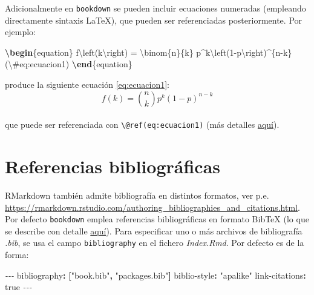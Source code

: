 \documentclass[
]{book}
\newenvironment{Shaded}{\begin{snugshade}}{\end{snugshade}}
\newcommand{\AttributeTok}[1]{\textcolor[rgb]{0.77,0.63,0.00}{#1}}
\newcommand{\CharTok}[1]{\textcolor[rgb]{0.31,0.60,0.02}{#1}}
\newcommand{\ExtensionTok}[1]{#1}
\newcommand{\FunctionTok}[1]{\textcolor[rgb]{0.00,0.00,0.00}{#1}}
\newcommand{\KeywordTok}[1]{\textcolor[rgb]{0.13,0.29,0.53}{\textbf{#1}}}
\newcommand{\NormalTok}[1]{#1}
\newcommand{\PreprocessorTok}[1]{\textcolor[rgb]{0.56,0.35,0.01}{\textit{#1}}}
\newcommand{\SpecialCharTok}[1]{\textcolor[rgb]{0.00,0.00,0.00}{#1}}
\newcommand{\SpecialStringTok}[1]{\textcolor[rgb]{0.31,0.60,0.02}{#1}}
\newcommand{\StringTok}[1]{\textcolor[rgb]{0.31,0.60,0.02}{#1}}
\theoremstyle{definition}
\theoremstyle{definition}
\theoremstyle{definition}
\theoremstyle{definition}
\theoremstyle{remark}
\begin{document}
Adicionalmente en \texttt{bookdown} se pueden incluir ecuaciones numeradas (empleando directamente sintaxis LaTeX), que pueden ser referenciadas posteriormente. Por ejemplo:

\begin{Shaded}
\begin{Highlighting}[]
\KeywordTok{\textbackslash{}begin}\NormalTok{\{}\ExtensionTok{equation}\NormalTok{\}}\SpecialStringTok{ }
\SpecialStringTok{  f}\SpecialCharTok{\textbackslash{}left}\SpecialStringTok{(k}\SpecialCharTok{\textbackslash{}right}\SpecialStringTok{) = }\SpecialCharTok{\textbackslash{}binom}\SpecialStringTok{\{n\}\{k\} p\^{}k}\SpecialCharTok{\textbackslash{}left}\SpecialStringTok{(1{-}p}\SpecialCharTok{\textbackslash{}right}\SpecialStringTok{)\^{}\{n{-}k\}}
\SpecialStringTok{  (}\SpecialCharTok{\textbackslash{}\#}\SpecialStringTok{eq:ecuacion1)}
\KeywordTok{\textbackslash{}end}\NormalTok{\{}\ExtensionTok{equation}\NormalTok{\}}
\end{Highlighting}
\end{Shaded}

produce la siguiente ecuación \eqref{eq:ecuacion1}:
\begin{equation}
f\left(k\right)=\binom{n}{k}p^k\left(1-p\right)^{n-k} \label{eq:ecuacion1}
\end{equation}\\
que puede ser referenciada con \texttt{\textbackslash{}@ref(eq:ecuacion1)}
(más detalles \href{https://bookdown.org/yihui/bookdown/markdown-extensions-by-bookdown.html\#equations}{aquí}).

\hypertarget{biblio}{%
\section{Referencias bibliográficas}\label{biblio}}

RMarkdown también admite bibliografía en distintos formatos, ver p.e. \url{https://rmarkdown.rstudio.com/authoring_bibliographies_and_citations.html}.
Por defecto \texttt{bookdown} emplea referencias bibliográficas en formato BibTeX
(lo que se describe con detalle \href{https://bookdown.org/yihui/bookdown/citations.html}{aquí}).
Para especificar uno o más archivos de bibliografía \emph{.bib}, se usa el campo \texttt{bibliography} en el fichero \emph{Index.Rmd}. Por defecto es de la forma:

\begin{Shaded}
\begin{Highlighting}[]
\PreprocessorTok{{-}{-}{-}}
\FunctionTok{bibliography}\KeywordTok{:}\AttributeTok{ }\KeywordTok{[}\StringTok{"book.bib"}\KeywordTok{,}\AttributeTok{ }\StringTok{"packages.bib"}\KeywordTok{]}
\FunctionTok{biblio{-}style}\KeywordTok{:}\AttributeTok{ }\StringTok{"apalike"}
\FunctionTok{link{-}citations}\KeywordTok{:}\AttributeTok{ }\CharTok{true}
\PreprocessorTok{{-}{-}{-}}
\end{Highlighting}
\end{Shaded}
\end{document}
